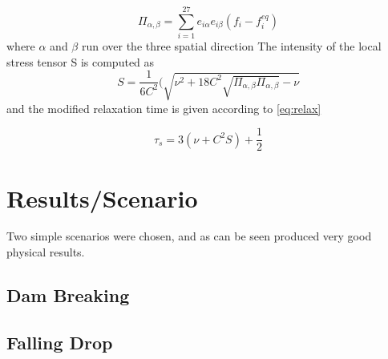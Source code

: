 \documentclass[10pt,a4paper,notitlepage]{article}
\begin{document}
\begin{equation} \label{eq:stress}
\Pi_{\alpha,\beta}=\sum^{27}_{i=1}e_{i\alpha}e_{i\beta}(f_{i}-f_{i}^{eq})
\end{equation}
where $\alpha$ and $\beta$ run over the three spatial direction
 The intensity of the local stress tensor S is computed as 
\begin{equation} \label{eq:intensity}
S=\frac{1}{6C^{2}}(\sqrt{\nu^{2}+18C^{2}\sqrt{\Pi_{\alpha,\beta}\Pi_{\alpha,\beta}}-\nu}
\end{equation}
and the modified relaxation time is given according to \eqref{eq:relax}

\begin{equation} \label{eq:relax}
\tau_s=3(\nu+C^{2}S)+\frac{1}{2}
\end{equation}
\section{Results/Scenario}
Two simple scenarios were chosen, and as can be seen produced very good physical results.
\subsection{Dam Breaking}
\subsection{Falling Drop}


\end{document}
